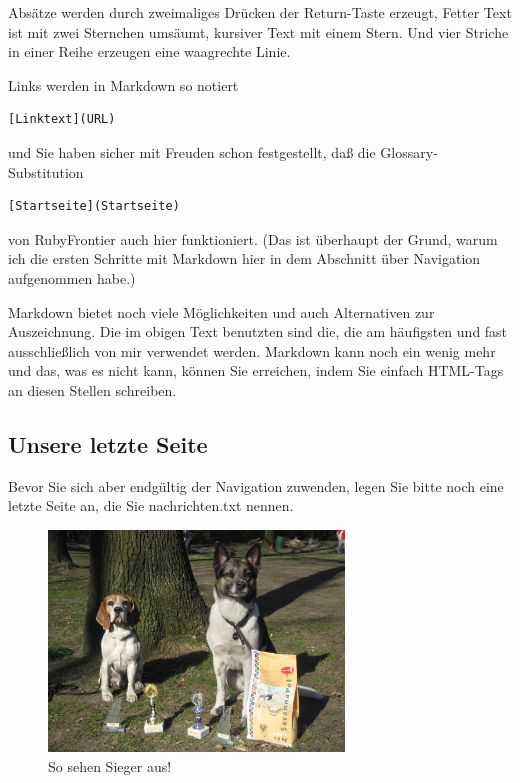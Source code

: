 \documentclass[11pt]{report}
\begin{document}
Absätze werden durch zweimaliges Drücken der Return-Taste erzeugt,
Fetter Text ist mit zwei Sternchen umsäumt, kursiver Text mit einem
Stern. Und vier Striche in einer Reihe erzeugen eine waagrechte Linie.


Links werden in Markdown so notiert


\begin{verbatim}
[Linktext](URL)
\end{verbatim}

und Sie haben sicher mit Freuden schon festgestellt, daß die
Glossary-Substitution


\begin{verbatim}
[Startseite](Startseite)
\end{verbatim}

von RubyFrontier auch hier funktioniert. (Das ist überhaupt der Grund,
warum ich die ersten Schritte mit Markdown hier in dem Abschnitt über
Navigation aufgenommen habe.)


Markdown bietet noch viele Möglichkeiten und auch Alternativen zur
Auszeichnung. Die im obigen Text benutzten sind die, die am häufigsten
und fast ausschließlich von mir verwendet werden. Markdown kann noch
ein wenig mehr und das, was es nicht kann, können Sie erreichen, indem
Sie einfach HTML-Tags an diesen Stellen schreiben.
\subsection{Unsere letzte Seite}
\label{sec-2-1-2-3}


Bevor Sie sich aber endgültig der Navigation zuwenden, legen Sie bitte
noch eine letzte Seite an, die Sie nachrichten.txt nennen.

\begin{figure}[h!]
\centering
\includegraphics[width=0.7\textwidth]{./images/sieger.jpg}
\caption{\label{sieger}So sehen Sieger aus!}
\end{figure}
\end{document}
